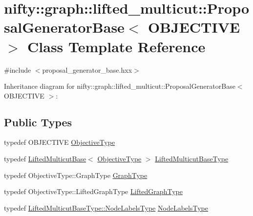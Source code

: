 \hypertarget{classnifty_1_1graph_1_1lifted__multicut_1_1ProposalGeneratorBase}{}\section{nifty\+:\+:graph\+:\+:lifted\+\_\+multicut\+:\+:Proposal\+Generator\+Base$<$ O\+B\+J\+E\+C\+T\+I\+V\+E $>$ Class Template Reference}
\label{classnifty_1_1graph_1_1lifted__multicut_1_1ProposalGeneratorBase}


{\ttfamily \#include $<$proposal\+\_\+generator\+\_\+base.\+hxx$>$}



Inheritance diagram for nifty\+:\+:graph\+:\+:lifted\+\_\+multicut\+:\+:Proposal\+Generator\+Base$<$ O\+B\+J\+E\+C\+T\+I\+V\+E $>$\+:
\subsection*{Public Types}
\begin{DoxyCompactItemize}
\item 
typedef O\+B\+J\+E\+C\+T\+I\+V\+E \hyperlink{classnifty_1_1graph_1_1lifted__multicut_1_1ProposalGeneratorBase_a281299b450646265dfc3fd229ce0e56c}{Objective\+Type}
\item 
typedef \hyperlink{classnifty_1_1graph_1_1lifted__multicut_1_1LiftedMulticutBase}{Lifted\+Multicut\+Base}$<$ \hyperlink{classnifty_1_1graph_1_1lifted__multicut_1_1ProposalGeneratorBase_a281299b450646265dfc3fd229ce0e56c}{Objective\+Type} $>$ \hyperlink{classnifty_1_1graph_1_1lifted__multicut_1_1ProposalGeneratorBase_ae9e1d4cfedcc81050a3ff95ef4ce0a7f}{Lifted\+Multicut\+Base\+Type}
\item 
typedef Objective\+Type\+::\+Graph\+Type \hyperlink{classnifty_1_1graph_1_1lifted__multicut_1_1ProposalGeneratorBase_a1c0bd2da212454a26c90f1a1a71249b1}{Graph\+Type}
\item 
typedef Objective\+Type\+::\+Lifted\+Graph\+Type \hyperlink{classnifty_1_1graph_1_1lifted__multicut_1_1ProposalGeneratorBase_aa4fc194ae840428c17220308febac32c}{Lifted\+Graph\+Type}
\item 
typedef \hyperlink{classnifty_1_1graph_1_1optimization_1_1common_1_1SolverBase_a6e4e465f3b6e039882669fcfb9714818}{Lifted\+Multicut\+Base\+Type\+::\+Node\+Labels\+Type} \hyperlink{classnifty_1_1graph_1_1lifted__multicut_1_1ProposalGeneratorBase_a15a73233a0b101c39e89b46e9b2cfa7a}{Node\+Labels\+Type}
\end{DoxyCompactItemize}
